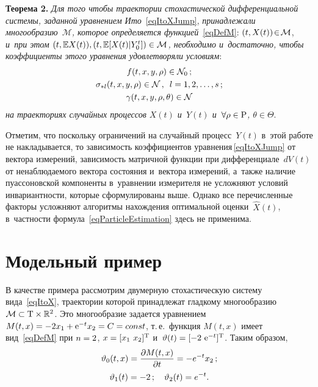 \begin{multicols}{2}
\textbf{Теорема 2.} \textit{Для того чтобы траектории стохастической дифференциальной 
сис\-те\-мы, заданной уравнением Ито}~\eqref{eqItoXJump}, 
\textit{принадлежали многообразию~$\mathcal{M}$, которое определяется
 функцией}~\eqref{eqDefM}:\linebreak 
$(t,X(t)) \hm\!\in\! \mathcal{M}$, \textit{и~при этом $(t,\mathbb{E} X(t)), 
(t,\mathbb{E}[X(t)|Y_0^t]) \hm\in \mathcal{M}$, необходимо и~достаточно, 
чтобы коэффициенты этого уравнения удовле\-тво\-ря\-ли условиям}:
\begin{gather*}
  f(t,x,y,\rho) \in \mathcal{N}_0\,; \\
   \sigma_{* l}(t,x,y,\rho) \in \mathcal{N}\,,\enskip 
   l = 1,2,\dots,s\,;\\
   \gamma(t,x,y,\rho,\theta) \in \mathcal{N}
\end{gather*}
\textit{на траекториях случайных процессов $X(t)$ и~$Y(t)$ 
и~$\forall \rho \hm\in \mathrm{P}$, $\theta \in \Theta$}.

\smallskip

Отметим, что поскольку ограничений на случайный процесс~$Y(t)$ в~этой работе 
не накладывает\-ся, то зависимость коэффициентов уравнения\,\eqref{eqItoXJump} 
от вектора измерений, зависимость мат\-рич\-ной функции при дифференциале~$dV(t)$ от 
ненаблюдаемого вектора состояния и~вектора измерений, а~также наличие пуассоновской 
компоненты в~уравнении измерителя не усложняют условий инвариантности, 
которые сформулированы выше. Однако все перечисленные факторы усложняют 
алгоритмы нахождения оптимальной оценки~$\hat X(t)$, в~частности 
формула~\eqref{eqParticleEstimation} здесь не применима.

\vspace*{-4pt}

\section{Модельный пример}

В качестве примера рассмотрим двумерную стохастическую систему вида~\eqref{eqItoX}, 
траектории которой принадлежат гладкому многообразию 
$\mathcal{M} \hm\subset \mathrm{T} \times \mathbb{R}^2$. 
Это многообразие задается уравнением $M(t,x) \hm= -2 x_1 \hm+ \mathrm{e}^{-t} x_2 
\hm= C \hm= {const}$, т.\,е.\ функция $M(t,x)$ имеет вид~\eqref{eqDefM} при 
$n \hm= 2$, $x \hm= [  x_1 \ x_2 ]^\trans$ и~$\vartheta(t) \hm= 
[ -2 \  \mathrm{e}^{-t}]^\trans$. Таким образом,
\begin{gather*}
  \vartheta_0(t,x) = \displaystyle\frac{\displaystyle \partial M(t,x)\mathstrut}{\displaystyle \partial t\mathstrut} = -{e}^{-t} x_2\,;\\ 
   \vartheta_1(t) = -2\,;\quad \vartheta_2(t) = {e}^{-t}.
\end{gather*}


\end{multicols}
